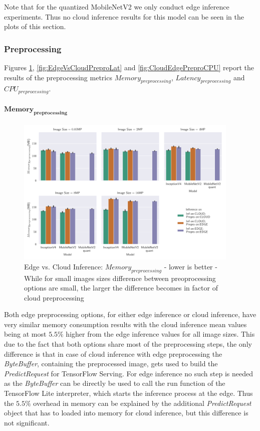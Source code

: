 Note that for the quantized MobileNetV2 we only conduct edge inference experiments. Thus no cloud inference results for this model can be seen in the plots of this section.
\subsubsection{Preprocessing}

Figures \ref{fig:EdgeVsCloudPreproMemory}, \ref{fig:EdgeVsCloudPreproLat} and \ref{fig:CloudEdgePreproCPU} report the results of the preprocessing metrics $Memory_{preprocessing}$, $Latency_{preprocessing}$ and $CPU_{preprocessing}$.

\paragraph{$\mathbf{Memory_{preprocessing}}$}
\begin{figure}[!htb]
\centering
\includegraphics[width=0.95\textwidth]{./Bilder/single_plots/edge_vs_cloud_plots/Edge_vs_Cloud_Inference_Preprocessing_Memory.pdf}
\caption[Edge vs. Cloud Inference:  $Memory_{preprocessing}$ - lower is better]{Edge vs. Cloud Inference:  $Memory_{preprocessing}$ - lower is better -
While for small images sizes difference between preoprocessing options are small, the larger the difference becomes in factor of cloud preprocessing}
\label{fig:EdgeVsCloudPreproMemory}
\end{figure}
Both edge preprocessing options, for either edge inference or cloud inference, have very similar memory consumption results with the cloud inference mean values being at most $5.5\%$ higher from the edge inference values for all image sizes.
This due to the fact that both options share most of the preprocessing steps, the only difference is that in case of cloud inference with edge preprocessing the \emph{ByteBuffer}, containing the preprocessed image, gets used to build the \emph{PredictRequest} for TensorFlow Serving. 
For edge inference no such step is needed as the \emph{ByteBuffer} can be directly be used to call the run function of the TensorFlow Lite interpreter, which starts the inference process at the edge.
Thus the $5.5\%$ overhead in memory can be explained by the additional \emph{PredictRequest} object that has to loaded into memory for cloud inference, but this difference is not significant.

